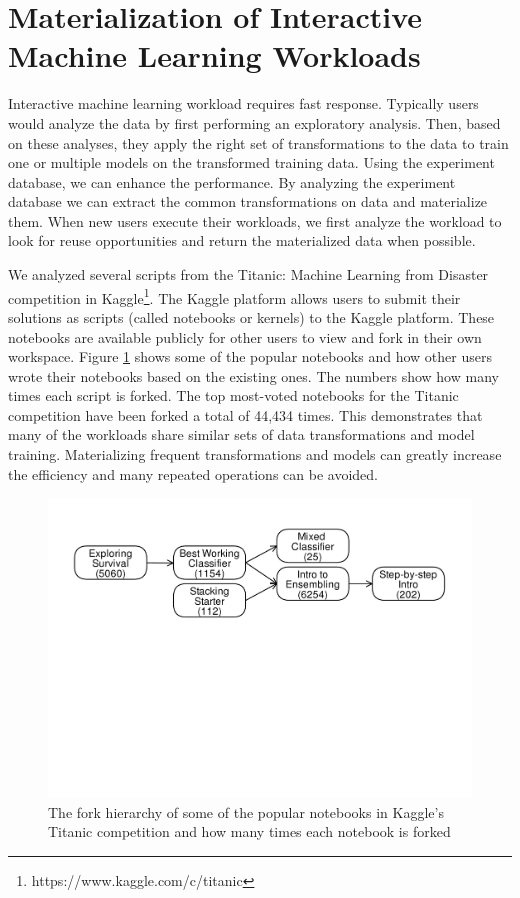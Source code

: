 \section{Materialization of Interactive Machine Learning Workloads} \label{sec-expert-expert}
Interactive machine learning workload requires fast response.
Typically users would analyze the data by first performing an exploratory analysis.
Then, based on these analyses, they apply the right set of transformations to the data to train one or multiple models on the transformed training data.
Using the experiment database, we can enhance the performance. 
By analyzing the experiment database we can extract the common transformations on data and materialize them.
When new users execute their workloads, we first analyze the workload to look for reuse opportunities and return the materialized data when possible.

We analyzed several scripts from the Titanic: Machine Learning from Disaster competition in Kaggle\footnote{https://www.kaggle.com/c/titanic}.
The Kaggle platform allows users to submit their solutions as scripts (called notebooks or kernels) to the Kaggle platform.
These notebooks are available publicly for other users to view and fork in their own workspace.
Figure \ref{fig-titanic-script-hierarchy} shows some of the popular notebooks and how other users wrote their notebooks based on the existing ones.
The numbers show how many times each script is forked.
The top most-voted notebooks for the Titanic competition have been forked a total of 44,434 times.
This demonstrates that many of the workloads share similar sets of data transformations and model training.
Materializing frequent transformations and models can greatly increase the efficiency and many repeated operations can be avoided.

\begin{figure}
\centering
\includegraphics[width=\columnwidth]{../images/kaggle-titanic-scripts-graph}
\caption{The fork hierarchy of some of the popular notebooks in Kaggle's Titanic competition and how many times each notebook is forked}
\label{fig-titanic-script-hierarchy}
\end{figure}

